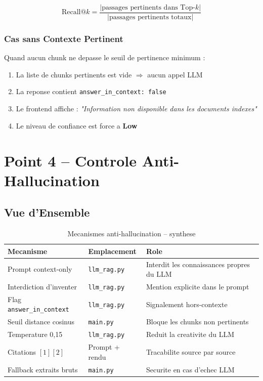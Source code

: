 \documentclass[12pt,a4paper]{article}
\begin{document}
\begin{equation}
\text{Recall@}k = \frac{|\text{passages pertinents dans Top-}k|}{|\text{passages pertinents totaux}|}
\label{eq:recall}
\end{equation}

\subsubsection{Cas sans Contexte Pertinent}

Quand aucun chunk ne depasse le seuil de pertinence minimum :

\begin{enumerate}
  \item La liste de chunks pertinents est vide $\Rightarrow$ aucun appel LLM
  \item La reponse contient \texttt{answer\_in\_context: false}
  \item Le frontend affiche : \textit{"Information non disponible dans les documents indexes"}
  \item Le niveau de confiance est force a \textbf{Low}
\end{enumerate}

\section{Point 4 -- Controle Anti-Hallucination}

\subsection{Vue d'Ensemble}

\begin{table}[h]
\centering
\caption{Mecanismes anti-hallucination -- synthese}
\begin{tabular}{lll}
\toprule
\textbf{Mecanisme} & \textbf{Emplacement} & \textbf{Role} \\
\midrule
Prompt context-only & \texttt{llm\_rag.py} & Interdit les connaissances propres du LLM \\
Interdiction d'inventer & \texttt{llm\_rag.py} & Mention explicite dans le prompt \\
Flag \texttt{answer\_in\_context} & \texttt{llm\_rag.py} & Signalement hors-contexte \\
Seuil distance cosinus & \texttt{main.py} & Bloque les chunks non pertinents \\
Temperature 0,15 & \texttt{llm\_rag.py} & Reduit la creativite du LLM \\
Citations $[1][2]$ & Prompt + rendu & Tracabilite source par source \\
Fallback extraits bruts & \texttt{main.py} & Securite en cas d'echec LLM \\
\bottomrule
\end{tabular}
\end{table}
\end{document}
